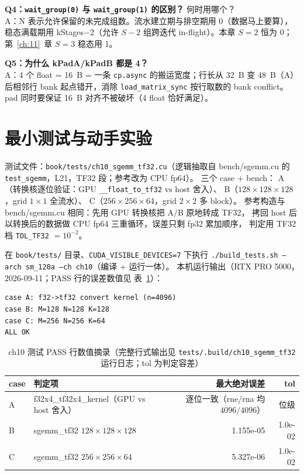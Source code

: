 \textbf{Q4：\texttt{wait\_\allowbreak{}group\allowbreak{}(0)} 与 \texttt{wait\_\allowbreak{}group\allowbreak{}(1)} 的区别？}
何时用哪个？\\
A：N 表示允许保留的未完成组数。流水建立期与排空期用 0（数据马上要算），
稳态满载期用 kStages$-$2（允许 $S{-}2$ 组跨迭代 in-flight）。本章
$S{=}2$ 恒为 0；第~\ref{ch:11}~章 $S{=}3$ 稳态用 1。

\textbf{Q5：为什么 kPadA/kPadB 都是 4？}\\
A：4 个 float = 16~B = 一条 \texttt{cp.async} 的搬运宽度；行长从 32~B 变
48~B（A）后相邻行 bank 起点错开，消除 \texttt{load\_\allowbreak{}matrix\_\allowbreak{}sync} 按行取数的
bank conflict。pad 同时要保证 16~B 对齐不被破坏（4 float 恰好满足）。

\section{最小测试与动手实验}

测试文件：\texttt{book/\allowbreak{}tests/\allowbreak{}ch10\_\allowbreak{}sgemm\_\allowbreak{}tf32.cu}（逻辑抽取自
bench/sgemm.cu 的 \texttt{test\_sgemm}，L21，TF32 段；参考改为 CPU fp64）。
三个 case + bench：
A（转换核逐位验证：GPU \texttt{\_\allowbreak{}\_\allowbreak{}float\_\allowbreak{}to\_\allowbreak{}tf32} vs host 舍入）、
B（$128\times128\times128$，grid $1\times1$ 全流水）、
C（$256\times256\times64$，grid $2\times2$ 多 block）。
参考构造与 bench/sgemm.cu 相同：先用 GPU 转换核把 A/B 原地转成 TF32，
拷回 host 后以转换后的数据做 CPU fp64 三重循环，误差只剩 fp32 累加顺序，
判定用 TF32 档 \texttt{TOL\_TF32} $= 10^{-2}$。

在 \texttt{book/tests/} 目录、\texttt{CUDA\_\allowbreak{}VISIBLE\_\allowbreak{}DEVICES=\allowbreak{}7} 下执行
\texttt{.\allowbreak{}/\allowbreak{}build\_\allowbreak{}tests.\allowbreak{}sh --arch sm\_\allowbreak{}120a --ch ch10}（编译 + 运行一体）。
本机运行输出（RTX PRO 5000，2026-09-11；PASS 行的误差数值见
表~\ref{tab:10-pass}）：

\begin{lstlisting}[style=console]
case A: f32->tf32 convert kernel (n=4096)
case B: M=128 N=128 K=128
case C: M=256 N=256 K=64
ALL OK
\end{lstlisting}

\begin{table}[htbp]
\centering
\caption{ch10 测试 PASS 行数值摘录（完整行式输出见
\texttt{tests/\allowbreak{}.build/\allowbreak{}ch10\_\allowbreak{}sgemm\_\allowbreak{}tf32} 运行日志；tol 为判定容差）}
\label{tab:10-pass}
\begin{tabular}{llrr}
\toprule
case & 判定项 & 最大绝对误差 & tol \\
\midrule
A & f32x4\_tf32x4\_kernel（GPU vs host 舍入） & 逐位一致（rne/rna 均 $4096/4096$） & 位级 \\
B & sgemm\_tf32 $128\times128\times128$ & 1.155e-05 & 1.0e-02 \\
C & sgemm\_tf32 $256\times256\times64$  & 5.327e-06 & 1.0e-02 \\
\bottomrule
\end{tabular}
\end{table}

